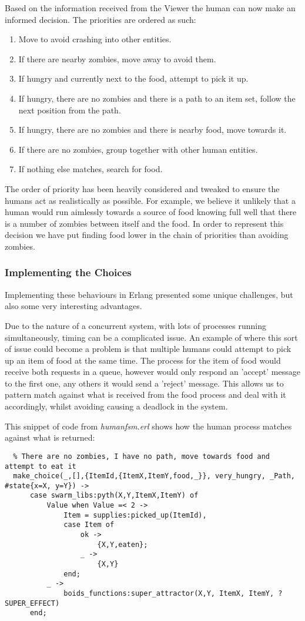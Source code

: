 Based on the information received from the Viewer the human can now make an informed decision. The priorities are ordered as such:
\begin{enumerate}
  \item Move to avoid crashing into other entities.
  \item If there are nearby zombies, move away to avoid them.
  \item If hungry and currently next to the food, attempt to pick it up.
  \item If hungry, there are no zombies and there is a path to an item set, follow the next position from the path.
  \item If hungry, there are no zombies and there is nearby food, move towards it.
  \item If there are no zombies, group together with other human entities.
  \item If nothing else matches, search for food.
\end{enumerate}

The order of priority has been heavily considered and tweaked to ensure the humans act as realistically as possible. For example, we believe it unlikely that a human would run aimlessly towards a source of food knowing full well that there is a number of zombies between itself and the food. In order to represent this decision we have put finding food lower in the chain of priorities than avoiding zombies.

\subsubsection{Implementing the Choices}
Implementing these behaviours in Erlang presented some unique challenges, but also some very interesting advantages.

Due to the nature of a concurrent system, with lots of processes running simultaneously, timing can be a complicated issue. An example of where this sort of issue could become a problem is that multiple humans could attempt to pick up an item of food at the same time. The process for the item of food would receive both requests in a queue, however would only respond an 'accept' message to the first one, any others it would send a 'reject' message. This allows us to pattern match against what is received from the food process and deal with it accordingly, whilst avoiding causing a deadlock in the system.

This snippet of code from \emph{human\textunderscore fsm.erl} shows how the human process matches against what is returned:
\begin{lstlisting}
  % There are no zombies, I have no path, move towards food and attempt to eat it
  make_choice(_,[],{ItemId,{ItemX,ItemY,food,_}}, very_hungry, _Path, #state{x=X, y=Y}) ->
      case swarm_libs:pyth(X,Y,ItemX,ItemY) of
          Value when Value =< 2 ->
              Item = supplies:picked_up(ItemId),
              case Item of
                  ok ->
                      {X,Y,eaten};
                  _ ->
                      {X,Y}
              end;
          _ ->
              boids_functions:super_attractor(X,Y, ItemX, ItemY, ?SUPER_EFFECT)
      end;
\end{lstlisting}

